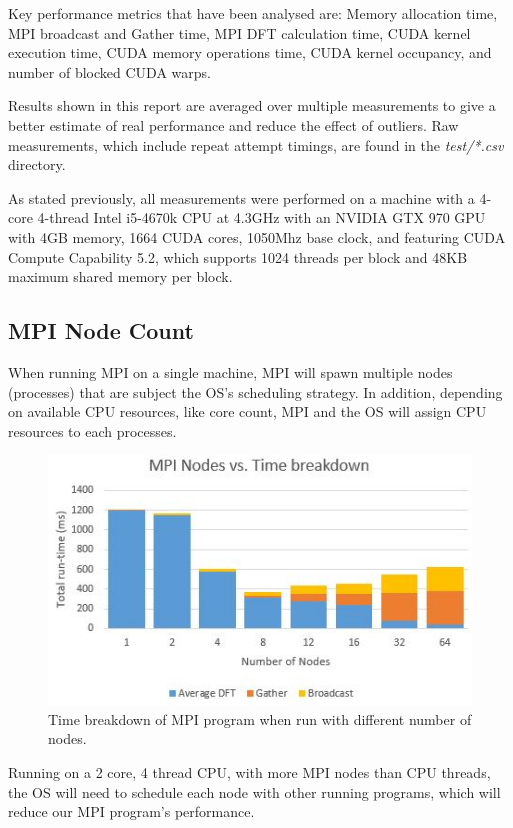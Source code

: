 \documentclass[11pt,a4paper]{article}
\begin{document}
Key performance metrics that have been analysed are: Memory allocation time, MPI broadcast and Gather time, MPI DFT calculation time, CUDA kernel execution time, CUDA memory operations time, CUDA kernel occupancy, and number of blocked CUDA warps.

Results shown in this report are averaged over multiple measurements to give a better estimate of real performance and reduce the effect of outliers. Raw measurements, which include repeat attempt timings, are found in the \textit{test/*.csv} directory.

As stated previously, all measurements were performed on a machine with a 4-core 4-thread Intel i5-4670k CPU at 4.3GHz with an NVIDIA GTX 970 GPU with 4GB memory, 1664 CUDA cores, 1050Mhz base clock, and featuring CUDA Compute Capability 5.2, which supports 1024 threads per block and 48KB maximum shared memory per block.

\subsection{MPI Node Count}\label{sect:MPI Node Count}
When running MPI on a single machine, MPI will spawn multiple nodes (processes) that are subject the OS's scheduling strategy. In addition, depending on available CPU resources, like core count, MPI and the OS will assign CPU resources to each processes.

\begin{figure}
\begin{center}
\includegraphics[scale=0.7]{mpi_eval_nodes}
\end{center}
\caption{Time breakdown of MPI program when run with different number of nodes.}
\label{fig:mpi_eval_nodes}
\end{figure}

Running on a 2 core, 4 thread CPU, with more MPI nodes than CPU threads, the OS will need to schedule each node with other running programs, which will reduce our MPI program's performance.
\end{document}
